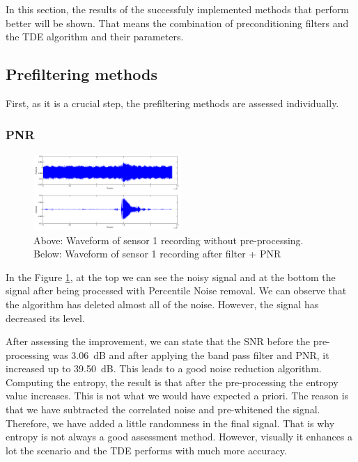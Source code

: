 In this section, the results of the successfuly implemented methods that perform better will be shown. That means the combination of preconditioning filters and the TDE algorithm and their parameters.

\subsection{Prefiltering methods}
First, as it is a crucial step, the prefiltering methods are assessed individually.

\subsubsection{PNR}

  \begin{figure}[htb]
	  \begin{center}
		  \includegraphics[width=0.5\textwidth]{figures/1PNR_waveform.png}
	  \end{center}
	  \caption{Above: Waveform of sensor 1 recording without pre-processing. Below: Waveform of sensor 1 recording after filter + PNR}
	  \label{fig:result_PNR_waveform}
  \end{figure}

  In the Figure \ref{fig:result_PNR_waveform}, at the top we can see the noisy signal and at the bottom the signal after being processed with Percentile Noise removal. We can observe that the algorithm has deleted almost all of the noise. However, the signal has decreased its level.

  After assessing the improvement, we can state that the SNR before the pre-processing was \SI{3.06}{\dB} and after applying the band pass filter and PNR, it increased up to \SI{39.50}{\dB}. This leads to a good noise reduction algorithm. Computing the entropy, the result is that after the pre-processing the entropy value increases. This is not what we would have expected a priori. The reason is that we have subtracted the correlated noise and pre-whitened the signal. Therefore, we have added a little randomness in the final signal. That is why entropy is not always a good assessment method. However, visually it enhances a lot the scenario and the TDE performs with much more accuracy.
  
